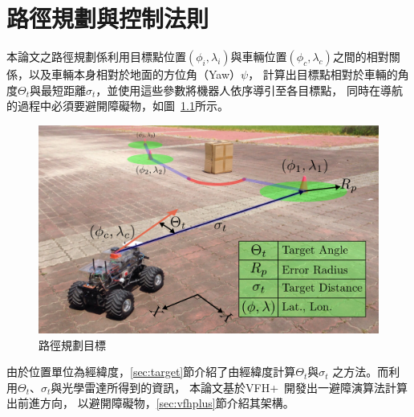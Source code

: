 \chapter{路徑規劃與控制法則}
\label{c:obstacle_avoidance}

本論文之路徑規劃係利用目標點位置$(\phi_i,\lambda_i)$與車輛位置$(\phi_c,\lambda_c)$之間的相對關係，以及車輛本身相對於地面的方位角（Yaw）$\psi$，
計算出目標點相對於車輛的角度$\Theta_t$與最短距離$\sigma_t$，並使用這些參數將機器人依序導引至各目標點，
同時在導航的過程中必須要避開障礙物，如圖~\ref{f:path_planning}所示。
\begin{figure}[h!]
	\centering
	\includegraphics[width=\textwidth]{figures/algorithm/pathplanning}
	\caption{路徑規劃目標}
	\label{f:path_planning}
\end{figure}

由於位置單位為經緯度，\ref{sec:target}節介紹了由經緯度計算$\Theta_t$與$\sigma_t$
之方法。而利用$\Theta_t$、$\sigma_t$與光學雷達所得到的資訊，
本論文基於VFH+~\cite{Ulrich:1998:VFHPlus}開發出一避障演算法計算出前進方向，
以避開障礙物，\ref{sec:vfhplus}節介紹其架構。

